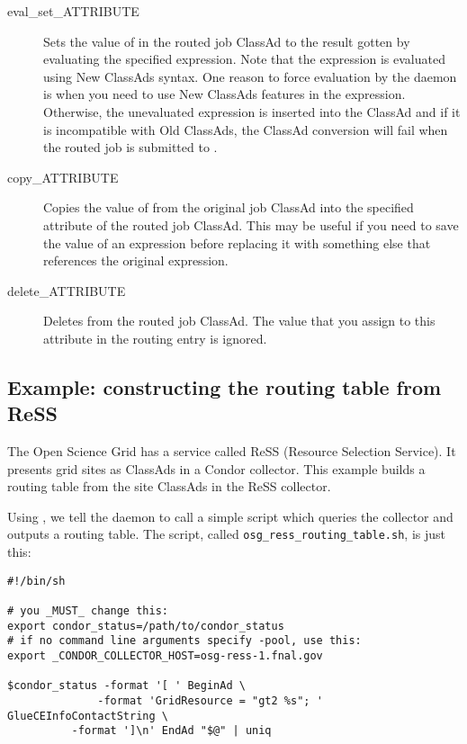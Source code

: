 \begin{description}
\item[eval\_set\_ATTRIBUTE] Sets the value of  in the
routed job ClassAd to the result gotten by evaluating the specified
expression.  Note that the expression is evaluated using New ClassAds
syntax.  One reason to force evaluation by the  daemon is when you need
to use New ClassAds features in the expression.  Otherwise, the
unevaluated expression is inserted into the ClassAd and if it is
incompatible with Old ClassAds, the ClassAd conversion will fail when
the routed job is submitted to .

\item[copy\_ATTRIBUTE] Copies the value of  from the
original job ClassAd into the specified attribute of the routed job
ClassAd.  This may be useful if you need to save the value of an
expression before replacing it with something else that references the
original expression.

\item[delete\_ATTRIBUTE] Deletes  from the routed job
ClassAd.  The value that you assign to this attribute in the routing
entry is ignored.

\end{description}

\subsection{\label{JobRouterReSSExample}Example: constructing the routing table from ReSS}

The Open Science Grid has a service called ReSS (Resource Selection
Service).  It presents grid sites as ClassAds in a Condor collector.
This example builds a routing table from the site ClassAds in the ReSS
collector.

Using , we tell the  daemon to call a
simple script which queries the collector and outputs a routing table.
The script, called \verb|osg_ress_routing_table.sh|, is just this:

\begin{verbatim}
#!/bin/sh

# you _MUST_ change this:
export condor_status=/path/to/condor_status
# if no command line arguments specify -pool, use this:
export _CONDOR_COLLECTOR_HOST=osg-ress-1.fnal.gov

$condor_status -format '[ ' BeginAd \
              -format 'GridResource = "gt2 %s"; ' GlueCEInfoContactString \
	      -format ']\n' EndAd "$@" | uniq
\end{verbatim}

